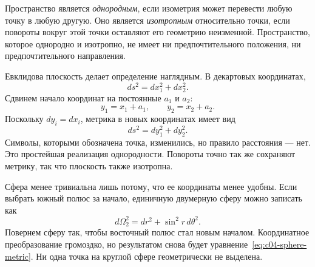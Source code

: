 \begin{definition}
Пространство является \emph{однородным}, если изометрия может перевести любую точку в любую другую. Оно является \emph{изотропным} относительно точки, если повороты вокруг этой точки оставляют его геометрию неизменной. Пространство, которое однородно и изотропно, не имеет ни предпочтительного положения, ни предпочтительного направления.
\end{definition}

Евклидова плоскость делает определение наглядным. В декартовых координатах,
\begin{equation}
ds^2=dx_1^2+dx_2^2.
\label{eq:c04-flat-metric}
\end{equation}
Сдвинем начало координат на постоянные \(a_1\) и \(a_2\):
\begin{equation}
y_1=x_1+a_1,
\qquad
y_2=x_2+a_2.
\label{eq:c04-flat-translation}
\end{equation}
Поскольку \(dy_i=dx_i\), метрика в новых координатах имеет вид
\begin{equation}
ds^2=dy_1^2+dy_2^2.
\end{equation}
Символы, которыми обозначена точка, изменились, но правило расстояния — нет. Это простейшая реализация однородности. Повороты точно так же сохраняют метрику, так что плоскость также изотропна.

Сфера менее тривиальна лишь потому, что ее координаты менее удобны. Если выбрать южный полюс за начало, единичную двумерную сферу можно записать как
\begin{equation}
d\Omega_2^2=dr^2+\sin^2 r\,d\theta^2.
\label{eq:c04-sphere-metric}
\end{equation}
Повернем сферу так, чтобы восточный полюс стал новым началом. Координатное преобразование громоздко, но результатом снова будет уравнение~\eqref{eq:c04-sphere-metric}. Ни одна точка на круглой сфере геометрически не выделена.

\begin{classroomqa}
\end{classroomqa}

